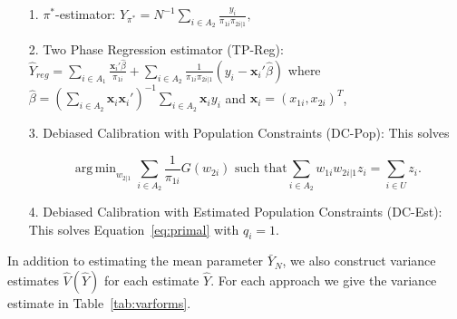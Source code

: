 \documentclass[12pt]{article}
\DeclareMathOperator*{\argmin}{arg\,min}
\renewcommand{\bf}[1]{\mathbf{#1}}
\begin{document}
\begin{itemize}
  \item[1.] $\pi^*$-estimator: $\hat Y_{\pi^*} = N^{-1} \sum_{i \in A_2}
    \frac{y_i}{\pi_{1i} \pi_{2i|1}},$
  \item[2.] Two Phase Regression estimator (TP-Reg): 
    $\hat Y_{reg} = \sum_{i \in A_1} \frac{\bf x_i' \hat \beta}{\pi_{1i}} + 
    \sum_{i \in A_2} \frac{1}{\pi_{1i}\pi_{2i|1}}(y_i - \bf x_i' \hat \beta)$ 
    where $\hat \beta = 
    \left(\sum_{i \in A_2} \bf x_i \bf x_i'\right)^{-1} \sum_{i \in A_2} \bf x_i y_i$
    and $\bf x_i = (x_{1i}, x_{2i})^T$,
  \item[3.] Debiased Calibration with Population Constraints (DC-Pop): This 
    solves 

  \begin{equation}
    \argmin_{w_{2|1}} \sum_{i \in A_2} \frac{1}{\pi_{1i}} G(w_{2i})
    \text{ such that}
    \sum_{i \in A_2} w_{1i} w_{2i|1} z_i = \sum_{i \in U} z_i.
  \end{equation}

  \item[4.] Debiased Calibration with Estimated Population Constraints (DC-Est):
    This solves Equation~\eqref{eq:primal} with $q_i = 1$.
\end{itemize}

In addition to estimating the mean parameter $\bar Y_N$, we also construct
variance estimates $\hat V(\hat Y)$ for each estimate $\hat Y$. For each
approach we give the variance estimate in Table~\ref{tab:varforms}.
\end{document}
